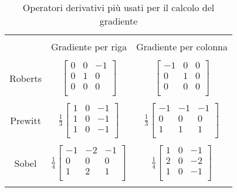 \begin{table}
\label{tab:gradiente}
\center
\caption{Operatori derivativi più usati per il calcolo del gradiente}
\begin{tabular}{ccc}
 &&\\  
 & Gradiente per riga & Gradiente per colonna \\
 &&\\ 
Roberts & $\left [\begin{matrix}
0 & 0 & -1\\

0 & 1 & 0\\

0  & 0 & 0\\
\end{matrix}\right ]$& $\left[ \begin{matrix}
-1 & 0 & 0\\

0 & 1 & 0\\

0  & 0 & 0\\
\end{matrix}\right ] $ \\ 
&&\\
Prewitt
&
$\frac{1}{3}\left [
\begin{matrix}
1& 0 &-1\\
1 &0& -1\\
1 &0& -1\\
\end{matrix}\right ]$
&
$\frac{1}{3}\left [\begin{matrix}
-1 &-1& -1\\
0  &0&  0\\
1  &1&  1\\
\end{matrix}\right ]$\\
&&\\
Sobel
&
$\frac{1}{4}\left [
\begin{matrix}
-1& -2 &-1\\
0 & 0 & 0\\
1 & 2 & 1\\
\end{matrix}\right ]$
&
$\frac{1}{4}\left [\begin{matrix}
1 & 0 & -1\\
2 & 0 & -2\\
1 & 0 & -1\\
\end{matrix}\right ]$\\
&&\\
\end{tabular} 
\end{table}

